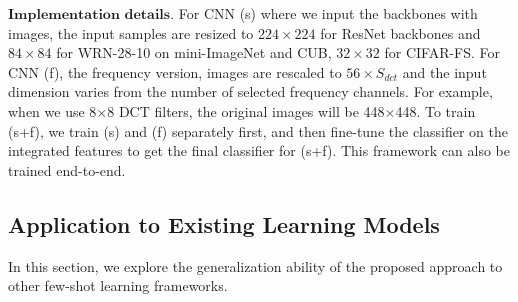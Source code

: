 \documentclass[10pt, conference, compsocconf]{IEEEtran}
\begin{document}
$\textbf{Implementation details.}$  For CNN (s) where we input the backbones with images, the input samples are resized to $224\times 224$ for ResNet \cite{he2016deep} backbones and $84 \times 84$ for WRN-28-10 \cite{zagoruyko2016wide} on mini-ImageNet and CUB, $32 \times 32$ for CIFAR-FS.  For CNN (f), the frequency version, images are rescaled to $56\times S_{dct}$ and the input dimension varies from the number of selected frequency channels. For example, when we use 8$\times$8 DCT filters, the original images will be 448$\times$448. {}{To train (s+f), we train (s) and (f) separately first, and then fine-tune the classifier on the integrated features to get the final classifier for (s+f). This framework can also be trained end-to-end.}

\subsection{Application to Existing Learning Models}
In this section, we explore the generalization ability of the proposed approach to other few-shot learning frameworks.
\end{document}
